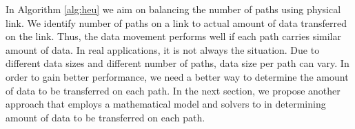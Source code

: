 In Algorithm \ref{alg:heu} we aim on balancing the number of paths using physical link. We identify number of paths on a link to actual amount of data transferred on the link.  Thus, the data movement performs well if each path carries similar amount of data. In real applications, it is not always the situation. Due to different data sizes and different number of paths, data size per path can vary. In order to gain better performance, we need a better way to determine the amount of data to be transferred on each path. In the next section, we propose another approach that employs a mathematical model and solvers to in determining  amount of data to be transferred on each path.
